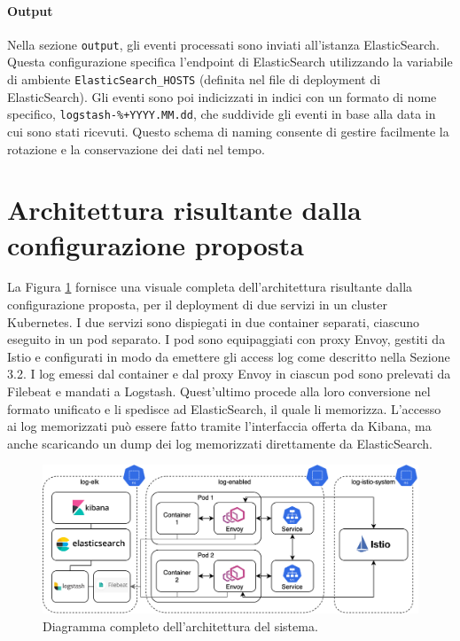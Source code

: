 \paragraph{Output}

Nella sezione \texttt{output}, gli eventi processati sono inviati all'istanza ElasticSearch. Questa configurazione specifica l'endpoint di ElasticSearch utilizzando la variabile di ambiente \texttt{ElasticSearch\_HOSTS} (definita nel file di deployment di ElasticSearch). Gli eventi sono poi indicizzati in indici con un formato di nome specifico, \texttt{logstash-\%{+YYYY.MM.dd}}, che suddivide gli eventi in base alla data in cui sono stati ricevuti. Questo schema di naming consente di gestire facilmente la rotazione e la conservazione dei dati nel tempo.

\section{Architettura risultante dalla configurazione proposta}

La Figura \ref{fig:full_diagram} fornisce una visuale completa dell'architettura risultante dalla configurazione proposta, per il deployment di due servizi in un cluster Kubernetes. I due servizi sono dispiegati in due container separati, ciascuno eseguito in un pod separato. I pod sono equipaggiati con proxy Envoy, gestiti da Istio e configurati in modo da emettere gli access log come descritto nella Sezione 3.2. I log emessi dal container e dal proxy Envoy in ciascun pod sono prelevati da Filebeat e mandati a Logstash. Quest’ultimo procede alla loro conversione nel formato unificato e li spedisce ad ElasticSearch, il quale li memorizza. L’accesso ai log memorizzati può essere fatto tramite l’interfaccia offerta da Kibana, ma anche scaricando un dump dei log memorizzati direttamente da ElasticSearch.

\begin{figure}[h]
    \centering
    \includegraphics[width=1\linewidth]{immagini/capitolo3/full_diagram.png}
    \caption{Diagramma completo dell'architettura del sistema.}
    \label{fig:full_diagram}
\end{figure}